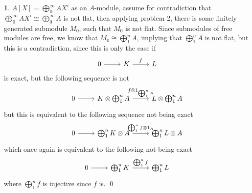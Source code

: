 \documentclass[11pt]{article}
\theoremstyle{definition}
\newtheorem{pb}{}
\begin{document}
    \begin{pb}
        \(A[X] = \bigoplus_0^\infty AX^i\) as an \(A\)-module, assume for contradiction that \(\bigoplus_0^\infty AX^i \cong \bigoplus_0^\infty A\) is not flat, then applying problem 2, there is some finitely generated submodule \(M_0\), such that \(M_0\) is not flat. Since submodules of free modules are free, we know that \(M_0 \cong \bigoplus_1^n A\), implying that \(\bigoplus_1^n A\) is not flat, but this is a contradiction, since this is only the case if
        \begin{equation*}
            \begin{tikzcd}
                0 \arrow[r,"{}"] &K \arrow[r,"{f}"] &L
            \end{tikzcd}
        \end{equation*}
        is exact, but the following sequence is not
        \begin{equation*}
            \begin{tikzcd}
                0 \arrow[r,"{}"] &K \otimes \bigoplus_1^n A \arrow[r,"{f \otimes 1_{\bigoplus_1^n A}}"] &L \otimes \bigoplus_1^n A
            \end{tikzcd}
        \end{equation*}
        but this is equivalent to the following sequence not being exact
        \begin{equation*}
            \begin{tikzcd}
                0 \arrow[r,"{}"]& \bigoplus_1^n K\otimes A \arrow[r,"{\bigoplus_1^n f \otimes 1_A}"] &\bigoplus_1^n L\otimes A
            \end{tikzcd}
        \end{equation*}
        which once again is equivalent to the following not being exact
        \begin{equation*}
            \begin{tikzcd}
                0 \arrow[r,"{}"] & \bigoplus_1^n K \arrow[r,"{\bigoplus_1^n f}"] & \bigoplus_1^n L
            \end{tikzcd}
        \end{equation*}
        where \(\bigoplus_1^n f\) is injective since \(f\) is. \qed
    \end{pb}
    
\end{document}
